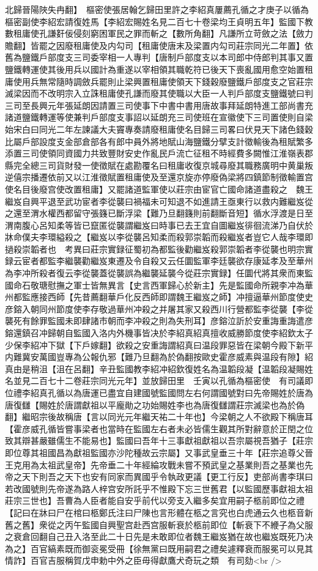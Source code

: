 北歸晉陽陜失冉翻】　樞密使張居翰乞歸田里許之李紹真屢薦孔循之才庚子以循為樞密副使李紹宏請復姓馬【李紹宏賜姓名見二百七十卷梁均王貞明五年】監國下教數租庸使孔謙姧佞侵刻窮困軍民之罪而斬之【數所角翻】凡謙所立苛斂之法【斂力贍翻】皆罷之因廢租庸使及内勾司【租庸使唐末及梁置内勾司莊宗同光二年置】依舊為鹽鐵戶部度支三司委宰相一人專判【唐制戶部度支以本司郎中侍郎判其事又置鹽鐵轉運使其後用兵以國計為重遂以宰相領其職乾符已後天下喪亂國用愈空始置租庸使用兵無常隨時調斂兵罷則止梁興置租庸使領天下錢穀廢鹽鐵戶部度支之官莊宗滅梁因而不改明宗入立誅租庸使孔謙而廢其使職以大臣一人判戶部度支鹽鐵號曰判三司至長興元年張延朗因請置三司使事下中書中書用唐故事拜延朗特進工部尚書充諸道鹽鐵轉運等使兼判戶部度支事詔以延朗充三司使班在宣徽使下三司置使則自梁始宋白曰同光二年左諫議大夫竇專奏請廢租庸使名目歸三司畧曰伏見天下諸色錢穀比屬戶部設度支金部倉部各有郎中員外將地賦山海鹽鐵分擘支計徵輸後為租賦繁多添置三司使領同資國力共致豐財安史作亂民戶流亡征租不時經費多闕惟江淮嶺表郡縣完全總三司貨財發一使徵賦在處勘覆名曰租庸收復京城尋廢其職務廣明中黄巢叛逆僖宗播遷依前又以江淮徵賦置租庸使及至還京旋亦停廢偽梁將四鎮節制徵輸置宫使名目後廢宫使改置租庸】又罷諸道監軍使以莊宗由宦官亡國命諸道盡殺之　魏王繼岌自興平退至武功宦者李從襲曰禍福未可知退不如進請王亟東行以救内難繼岌從之還至渭水權西都留守張籛已斷浮梁【難乃旦翻籛則前翻斷音短】循水浮渡是日至渭南腹心呂知柔等皆已竄匿從襲謂繼岌曰時事已去王宜自圖繼岌徘徊流涕乃自伏於牀命僕夫李環縊殺之【繼岌以李從襲呂知柔而殺郭崇韜而殺繼岌者豈它人哉李環即撾殺崇韜者也　考異曰莊宗實録征蜀初為都監後勸繼岌殺郭崇韜者李從襲也明宗實録云宦者都監李繼襲勸繼岌東遷及令自殺又云任圜監軍李廷襲欲存康延孝及至華州為李冲所殺者復云李從襲蓋從襲誤為繼襲延襲今從莊宗實録】任圜代將其衆而東監國命石敬瑭慰撫之軍士皆無異言【史言西軍歸心於新主】先是監國命所親李冲為華州都監應接西師【先昔薦翻華戶化反西師即謂魏王繼岌之師】冲擅逼華州節度使史彦鎔入朝同州節度使李存敬過華州冲殺之并屠其家又殺西川行營都監李從襲【李從襲死有餘罪監國未即肆諸市朝而李冲殺之則為失刑耳】彦鎔泣訢於安重誨重誨遣彦鎔還鎮召冲歸朝自監國入洛内外機事皆决於李紹真紹真擅收威勝節度使李紹欽太子少保李紹冲下獄【下戶嫁翻】欲殺之安重誨謂紹真曰温段罪惡皆在梁朝今殿下新平内難冀安萬國豈專為公報仇邪【難乃旦翻為於偽翻按歐史霍彦威素與温段有隙】紹真由是稍沮【沮在呂翻】辛丑監國教李紹冲紹欽復姓名為温韜段凝【温韜段凝賜姓名並見二百七十二卷莊宗同光元年】並放歸田里　壬寅以孔循為樞密使　有司議即位禮李紹真孔循以為唐運已盡宜自建國號監國問左右何謂國號對曰先帝賜姓於唐為唐復讎【賜姓於唐謂獻祖以平龐勛之功始賜姓李也為唐復讎謂莊宗滅梁也為於偽翻】繼昭宗後故稱唐【言以同光元年繼天祐二十年也】今梁朝之人不欲殿下稱唐耳【霍彦威孔循皆嘗事梁者也當時在監國左右者未必皆儒生觀其所對辭意於正閏之位致其辯甚嚴雖儒生不能易也】監國曰吾年十三事獻祖獻祖以吾宗屬視吾猶子【莊宗即位尊其祖國昌為獻祖監國亦沙陀種故云宗屬】又事武皇垂三十年【莊宗追尊父晉王克用為太祖武皇帝】先帝垂二十年經綸攻戰未嘗不預武皇之基業則吾之基業也先帝之天下則吾之天下也安有同家而異國乎令執政更議【更工行反】吏部尚書李琪曰若改國號則先帝遂為路人梓宫安所託乎不惟殿下忘三世舊君【以監國歷事獻祖太祖莊宗三世也】吾曹為人臣者能自安乎前代以旁支入繼多矣宜用嗣子柩前即位之禮【記曰在牀曰尸在棺曰柩鄭氏注曰尸陳也言形體在柩之言究也白虎通云久也柩音新舊之舊】衆從之丙午監國自興聖宫赴西宫服斬衰於柩前即位【斬衰下不緶子為父服之衰倉回翻自己丑入洛至此二十日先是未敢即位者魏王繼岌猶在故也繼岌既死乃决為之】百官縞素既而御衮冕受冊【徐無黨曰既用嗣君之禮矣遽釋衰而服冕可以見其情詐】百官吉服稱賀戊申勅中外之臣毋得獻鷹犬奇玩之類　有司劾<br />
